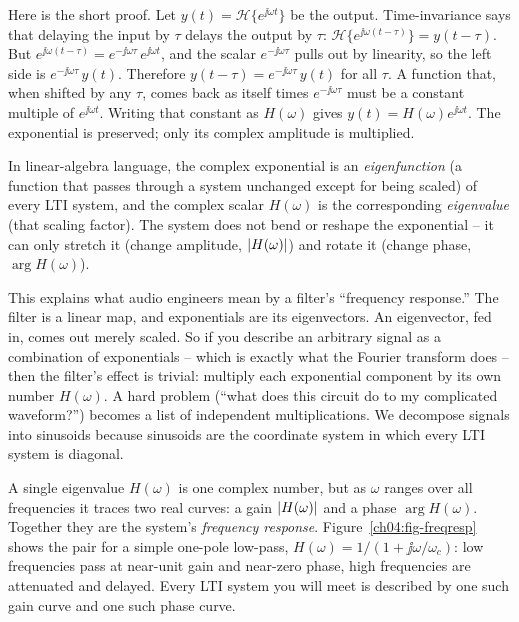 \begin{whybox}
Here is the short proof. Let $y(t) = \mathcal{H}\{e^{\jj\omega t}\}$ be the output.
Time-invariance says that delaying the input by $\tau$ delays the output by $\tau$:
$\mathcal{H}\{e^{\jj\omega(t-\tau)}\} = y(t-\tau)$. But $e^{\jj\omega(t-\tau)} = e^{-\jj\omega\tau}\,
e^{\jj\omega t}$, and the scalar $e^{-\jj\omega\tau}$ pulls out by linearity, so the left side is
$e^{-\jj\omega\tau}\,y(t)$. Therefore $y(t-\tau) = e^{-\jj\omega\tau}\,y(t)$ for all $\tau$. A
function that, when shifted by any $\tau$, comes back as itself times $e^{-\jj\omega\tau}$ must be a
constant multiple of $e^{\jj\omega t}$. Writing that constant as $H(\omega)$ gives
$y(t) = H(\omega)e^{\jj\omega t}$. The exponential is preserved; only its complex amplitude is
multiplied.
\end{whybox}

In linear-algebra language, the complex exponential is an \emph{eigenfunction} (a function that passes through a system unchanged except for being scaled) of every LTI system, and the complex scalar $H(\omega)$ is the corresponding \emph{eigenvalue} (that scaling factor). The system does not bend or reshape the
exponential -- it can only stretch it (change amplitude, $\lvert H(\omega)\rvert$) and rotate it (change
phase, $\arg H(\omega)$).

\begin{happeningbox}
This explains what audio engineers mean by a filter's ``frequency
response.'' The filter is a linear map, and exponentials are its eigenvectors. An eigenvector,
fed in, comes out merely scaled. So if you describe an arbitrary signal as a combination of
exponentials -- which is exactly what the Fourier transform does -- then the filter's effect is
trivial: multiply each exponential component by its own number $H(\omega)$. A hard problem
(``what does this circuit do to my complicated waveform?'') becomes a list of independent
multiplications. We decompose signals into sinusoids because sinusoids are the
coordinate system in which every LTI system is diagonal.
\end{happeningbox}

A single eigenvalue $H(\omega)$ is one complex number, but as $\omega$ ranges over all frequencies
it traces two real curves: a gain $\lvert H(\omega)\rvert$ and a phase $\arg H(\omega)$. Together they are
the system's \emph{frequency response}. Figure~\ref{ch04:fig-freqresp} shows the pair for a simple
one-pole low-pass, $H(\omega) = 1/(1 + \jj\omega/\omega_c)$: low frequencies pass at near-unit gain
and near-zero phase, high frequencies are attenuated and delayed. Every LTI system you will meet is
described by one such gain curve and one such phase curve.

